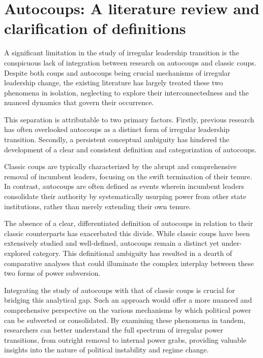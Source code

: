 \documentclass[
  12pt,
]{report}
\begin{document}
\section{Autocoups: A literature review and clarification of
definitions}\label{autocoups-a-literature-review-and-clarification-of-definitions}

A significant limitation in the study of irregular leadership transition
is the conspicuous lack of integration between research on autocoups and
classic coups. Despite both coups and autocoups being crucial mechanisms
of irregular leadership change, the existing literature has largely
treated these two phenomena in isolation, neglecting to explore their
interconnectedness and the nuanced dynamics that govern their
occurrence.

This separation is attributable to two primary factors. Firstly,
previous research has often overlooked autocoups as a distinct form of
irregular leadership transition. Secondly, a persistent conceptual
ambiguity has hindered the development of a clear and consistent
definition and categorization of autocoups.

Classic coups are typically characterized by the abrupt and
comprehensive removal of incumbent leaders, focusing on the swift
termination of their tenure. In contrast, autocoups are often defined as
events wherein incumbent leaders consolidate their authority by
systematically usurping power from other state institutions, rather than
merely extending their own tenure.

The absence of a clear, differentiated definition of autocoups in
relation to their classic counterparts has exacerbated this divide.
While classic coups have been extensively studied and well-defined,
autocoups remain a distinct yet under-explored category. This
definitional ambiguity has resulted in a dearth of comparative analyses
that could illuminate the complex interplay between these two forms of
power subversion.

Integrating the study of autocoups with that of classic coups is crucial
for bridging this analytical gap. Such an approach would offer a more
nuanced and comprehensive perspective on the various mechanisms by which
political power can be subverted or consolidated. By examining these
phenomena in tandem, researchers can better understand the full spectrum
of irregular power transitions, from outright removal to internal power
grabs, providing valuable insights into the nature of political
instability and regime change.
\end{document}

